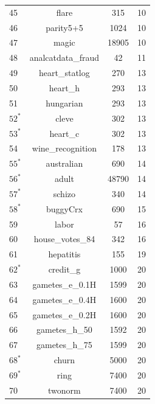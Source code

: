 \documentclass[a4paper,american,reqno]{amsart}
\begin{document}
\begin{center}
\begin{longtable}{l c c c }
    45                        &  flare                        &  315   &  10 \\
    46                        &  parity5+5                    &  1024  &  10\\
    $47$                        &  magic                        &  18905 &  10 \\
    48                        &  analcatdata\_fraud           &  42    &  11 \\
    $49$                        &  heart\_statlog               &  270   &  13 \\
    50                        & heart\_h                                                                                    & 293                          & 13  \\
    51 &  hungarian                             &  293   &  13   \\
    $52^*$ &  cleve           &  302   &  13   \\
    $53^*$ &  heart\_c         &  302   &  13  \\
    54 &  wine\_recognition           &  178   &  13   \\
    $55^*$ &  australian               &  690   &  14 \\
    $56^*$ &  adult   &  48790 &  14   \\
    $57^*$ &  schizo    &  340   &  14   \\
    $58^*$ &  buggyCrx    &  690   &  15   \\
    59 &  labor        &  57    &  16   \\
    60 &  house\_votes\_84           &  342   &  16   \\
    61 &  hepatitis             &  155   &  19   \\
    $62^*$ &  credit\_g                    &  1000  &  20   \\
    63 &  gametes\_e\_0.1H             &  1599  &  20   \\
    64 &  gametes\_e\_0.4H                &  1600  &  20   \\
    65 &  gametes\_e\_0.2H               &  1600  &  20   \\
    66 &  gametes\_h\_50 &  1592  &  20   \\
    67 &  gametes\_h\_75 &  1599  &  20   \\
    $68^*$ &  churn      &  5000  &  20   \\
    $69^*$ &  ring        &  7400  &  20   \\
    70 &  twonorm         &  7400  &  20   \\

\end{longtable}
\end{center}
\end{document}
